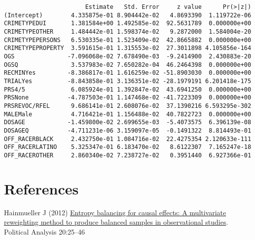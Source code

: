 \documentclass[
  letterpaper,
  DIV=11,
  numbers=noendperiod]{scrartcl}
\newlength{\cslhangindent}
\newlength{\cslentryspacingunit} %
\newenvironment{CSLReferences}[2] %
 {%
  \setlength{\parindent}{0pt}
  \ifodd #1
  \let\oldpar\par
  \def\par{\hangindent=\cslhangindent\oldpar}
  \fi
  \setlength{\parskip}{#2\cslentryspacingunit}
 }%
 {}
\begin{document}
\begin{verbatim}
                       Estimate   Std. Error     z value      Pr(>|z|)
(Intercept)        4.335875e-01 8.904442e-02   4.8693390  1.119722e-06
CRIMETYPEDUI       1.381584e+00 1.492585e-02  92.5631789  0.000000e+00
CRIMETYPEOTHER     1.484442e-01 1.598374e-02   9.2872000  1.584004e-20
CRIMETYPEPERSONS   6.530335e-01 1.523409e-02  42.8665882  0.000000e+00
CRIMETYPEPROPERTY  3.591615e-01 1.315553e-02  27.3011898 4.105856e-164
OGS               -7.096068e-02 7.678490e-03  -9.2414900  2.430883e-20
OGSQ               3.537983e-02 7.650282e-04  46.2464398  0.000000e+00
RECMINYes         -8.386817e-01 1.616259e-02 -51.8903030  0.000000e+00
TRIALYes          -8.843858e-01 3.136351e-02 -28.1979191 6.201418e-175
PRS4/5             6.085924e-01 1.392847e-02  43.6941250  0.000000e+00
PRSNone           -4.787503e-01 1.147468e-02 -41.7223309  0.000000e+00
PRSREVOC/RFEL      9.686141e-01 2.608076e-02  37.1390216 6.593295e-302
MALEMale           4.716421e-01 1.156488e-02  40.7822723  0.000000e+00
DOSAGE            -1.459800e-02 2.699655e-03  -5.4073575  6.396139e-08
DOSAGEQ           -4.711231e-06 3.159097e-05  -0.1491322  8.814493e-01
OFF_RACERBLACK     2.432750e-01 1.084716e-02  22.4275354 2.120633e-111
OFF_RACERLATINO    5.325347e-01 6.183470e-02   8.6122307  7.165247e-18
OFF_RACEROTHER     2.860340e-02 7.238727e-02   0.3951440  6.927366e-01
\end{verbatim}

\hypertarget{references}{%
\section*{References}\label{references}}

\hypertarget{refs}{}
\begin{CSLReferences}{1}{0}
\leavevmode{}%
Hainmueller J (2012)
\href{https://www.jstor.org/stable/41403737}{Entropy balancing for
causal effects: A multivariate reweighting method to produce balanced
samples in observational studies}. Political Analysis 20:25--46

\end{CSLReferences}
\end{document}
